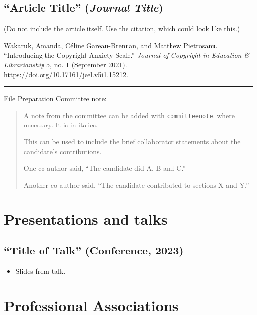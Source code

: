 \documentclass[12pt,oneside]{book}
\newcommand{\committeenote}[1] {%
\par\noindent\rule{\textwidth}{1pt}
{\large File Preparation Committee note:}
\begin{quote}
  \itshape{}
  {\small #1}
\end{quote}
}
\begin{document}
\subsection{``Article Title'' (\textit{Journal Title})}


(Do not include the article itself.  Use the citation, which could look like this.)


Wakaruk, Amanda, Céline Gareau-Brennan, and Matthew Pietrosanu. ``Introducing the Copyright Anxiety Scale.'' \textit{Journal of Copyright in Education \& Librarianship} 5, no. 1 (September 2021). \url{https://doi.org/10.17161/jcel.v5i1.15212}.

\vspace{\baselineskip}

\committeenote{A note from the committee can be added with {\tt committeenote}, where necessary.  It is in italics.

  This can be used to include the brief collaborator statements about the candidate's contributions.

  One co-author said, ``The candidate did A, B and C.''

  Another co-author said, ``The candidate contributed to sections X and Y.''

}

\newpage

\section{Presentations and talks}

\subsection{``Title of Talk'' (Conference, 2023)}

\begin{itemize}
  \item Slides from talk.
\end{itemize}


\section{Professional Associations}
\end{document}
